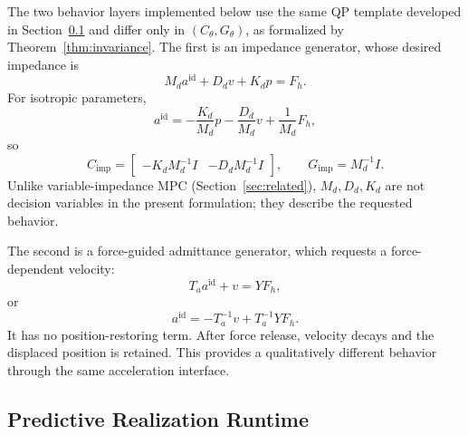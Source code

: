 \documentclass[journal]{IEEEtran}
\begin{document}
The two behavior layers implemented below use the same QP template
developed in Section~\ref{sec:qp} and differ only in $(C_\theta,G_\theta)$,
as formalized by Theorem~\ref{thm:invariance}. The first is an impedance
generator, whose desired impedance is
\begin{equation}
M_d a^{\mathrm{id}}+D_dv+K_dp=F_h.
\end{equation}
For isotropic parameters,
\begin{equation}
a^{\mathrm{id}} =-\frac{K_d}{M_d}p-\frac{D_d}{M_d}v+\frac{1}{M_d}F_h,
\end{equation}
so
\begin{equation}
C_{\mathrm{imp}} =\begin{bmatrix} -K_dM_d^{-1}I&-D_dM_d^{-1}I \end{bmatrix},
\qquad G_{\mathrm{imp}}=M_d^{-1}I.
\end{equation}
Unlike variable-impedance MPC (Section~\ref{sec:related}), $M_d,D_d,K_d$
are not decision variables in the present formulation; they describe the
requested behavior.

The second is a force-guided admittance generator, which requests a
force-dependent velocity:
\begin{equation}
T_a a^{\mathrm{id}}+v=YF_h,
\end{equation}
or
\begin{equation}
a^{\mathrm{id}}=-T_a^{-1}v+T_a^{-1}YF_h.
\end{equation}
It has no position-restoring term. After force release, velocity decays
and the displaced position is retained. This provides a qualitatively
different behavior through the same acceleration interface.

\subsection{Predictive Realization Runtime}
\label{sec:qp}
\end{document}

